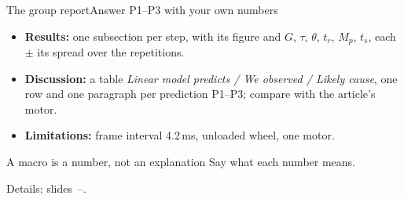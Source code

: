 %
\begin{frame}{The group report}{Answer P1--P3 with your own numbers}
  \small
  \begin{itemize}\setlength{\itemsep}{7pt}
    \item \textbf{Results:} one subsection per step, with its figure and $G$, $\tau$, $\theta$, $t_r$, $M_p$, $t_s$, each $\pm$ its spread over the repetitions.
    \item \textbf{Discussion:} a table \emph{Linear model predicts / We observed / Likely cause}, one row and one paragraph per prediction P1--P3; compare with the article's motor.
    \item \textbf{Limitations:} frame interval 4.2\,ms, unloaded wheel, one motor.
  \end{itemize}
  \vspace{8pt}
  \begin{alertblock}{\small A macro is a number, not an explanation}
    Say what each number means.
  \end{alertblock}

  \vfill
  {\footnotesize Details: slides~\pageref{app:report-template}--\pageref{app:report-guidance}.}
\end{frame}
